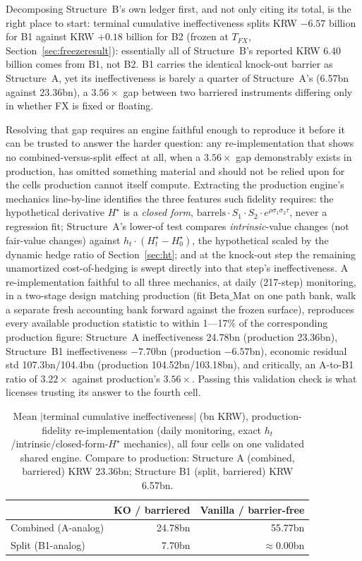 \documentclass[11pt,a4paper]{article}
\begin{document}
Decomposing Structure~B's own ledger first, and not only citing its total, is the right place to start: terminal cumulative ineffectiveness splits KRW $-6.57$ billion for B1 against KRW $+0.18$ billion for B2 (frozen at $T_{FX}$, Section~\ref{sec:freezeresult}): essentially all of Structure~B's reported KRW 6.40 billion comes from B1, not B2. B1 carries the identical knock-out barrier as Structure~A, yet its ineffectiveness is barely a quarter of Structure~A's (6.57bn against 23.36bn), a $3.56\times$ gap between two barriered instruments differing only in whether FX is fixed or floating.

Resolving that gap requires an engine faithful enough to reproduce it before it can be trusted to answer the harder question: any re-implementation that shows no combined-versus-split effect at all, when a $3.56\times$ gap demonstrably exists in production, has omitted something material and should not be relied upon for the cells production cannot itself compute. Extracting the production engine's mechanics line-by-line identifies the three features such fidelity requires: the hypothetical derivative $H^\star$ is a \emph{closed form}, $\mathrm{barrels}\cdot S_1\cdot S_2\cdot e^{\rho\sigma_1\sigma_2\tau}$, never a regression fit; Structure~A's lower-of test compares \emph{intrinsic}-value changes (not fair-value changes) against $h_t\cdot(H^\star_t-H^\star_0)$, the hypothetical scaled by the dynamic hedge ratio of Section~\ref{sec:ht}; and at the knock-out step the remaining unamortized cost-of-hedging is swept directly into that step's ineffectiveness. A re-implementation faithful to all three mechanics, at daily (217-step) monitoring, in a two-stage design matching production (fit $\mathrm{Beta\_Mat}$ on one path bank, walk a separate fresh accounting bank forward against the frozen surface), reproduces every available production statistic to within 1---17\% of the corresponding production figure: Structure~A ineffectiveness 24.78bn (production 23.36bn), Structure~B1 ineffectiveness $-7.70$bn (production $-6.57$bn), economic residual std 107.3bn/104.4bn (production 104.52bn/103.18bn), and critically, an A-to-B1 ratio of $3.22\times$ against production's $3.56\times$. Passing this validation check is what licenses trusting its answer to the fourth cell.

\begin{table}[h]
\centering
\small
\begin{tabular}{lrr}
\toprule
 & KO / barriered & Vanilla / barrier-free \\
\midrule
Combined (A-analog) & 24.78bn & 55.77bn \\
Split (B1-analog) & 7.70bn & $\approx$0.00bn \\
\bottomrule
\end{tabular}
\caption{Mean $|$terminal cumulative ineffectiveness$|$ (bn KRW), production-fidelity re-implementation (daily monitoring, exact $h_t$/intrinsic/closed-form-$H^\star$ mechanics), all four cells on one validated shared engine. Compare to production: Structure A (combined, barriered) KRW 23.36bn; Structure B1 (split, barriered) KRW 6.57bn.}
\label{tab:fourthcell}
\end{table}
\end{document}
